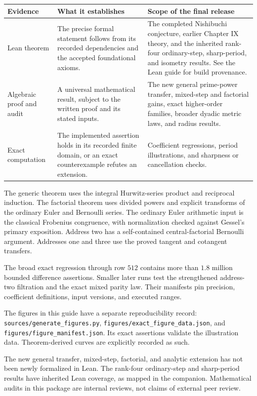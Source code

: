 \begin{center}
\begin{tabular}{p{.23\linewidth}p{.34\linewidth}p{.34\linewidth}}
\toprule
Evidence & What it establishes & Scope of the final release \\
\midrule
Lean theorem & The precise formal statement follows from its recorded
dependencies and the accepted foundational axioms. & The completed Nishibuchi
conjecture, earlier Chapter IX theory, and the inherited rank-four ordinary-step,
sharp-period, and isometry results. See the Lean guide for build provenance. \\
\addlinespace
Algebraic proof and audit & A universal mathematical result, subject to the
written proof and its stated inputs. & The new general prime-power transfer,
mixed-step and factorial gains, exact higher-order families, broader dyadic
metric laws, and radius results. \\
\addlinespace
Exact computation & The implemented assertion holds in its recorded finite
domain, or an exact counterexample refutes an extension. & Coefficient
regressions, period illustrations, and sharpness or cancellation checks. \\
\bottomrule
\end{tabular}
\end{center}

The generic theorem uses the integral Hurwitz-series product and reciprocal
induction. The factorial theorem uses divided powers and explicit transforms
of the ordinary Euler and Bernoulli series. The ordinary Euler arithmetic
input is the classical Frobenius congruence, with normalization checked against
Gessel's primary exposition. Address two has a self-contained central-factorial
Bernoulli argument. Addresses one and three use the proved tangent and
cotangent transfers.

The broad exact regression through row $512$ contains more than $1.8$ million
bounded difference assertions. Smaller later runs test the strengthened
address-two filtration and the exact mixed parity law. Their manifests pin
precision, coefficient definitions, input versions, and executed ranges.

The figures in this guide have a separate reproducibility record:
\texttt{sources/generate\_figures.py},
\texttt{figures/exact\_figure\_data.json}, and
\texttt{figures/figure\_manifest.json}. Its exact assertions validate the
illustration data. Theorem-derived curves are explicitly recorded as such.

The new general transfer, mixed-step, factorial, and analytic extension has
not been newly formalized in Lean. The rank-four ordinary-step and sharp-period
results have inherited Lean coverage, as mapped in the companion. Mathematical audits
in this package are internal reviews, not claims of external peer review.

